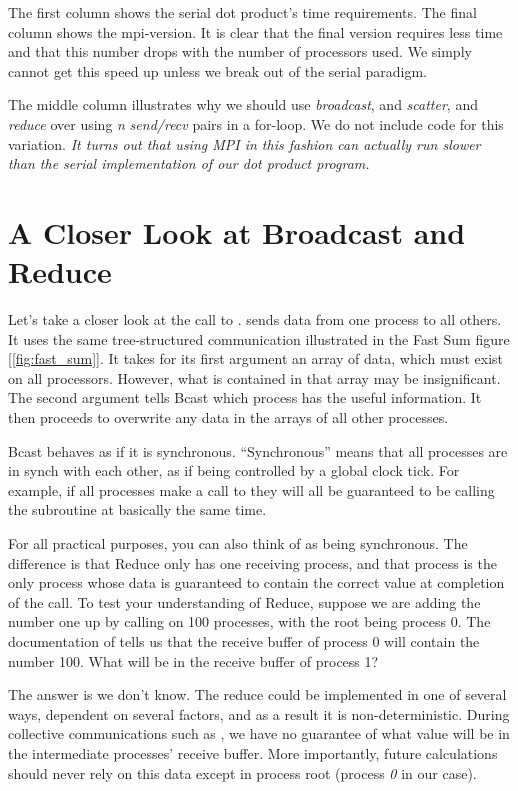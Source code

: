 The first column shows the serial dot product's time requirements. The final column shows the mpi-version. It is clear that the final version requires less time and that this number drops with the number of processors used. We simply cannot get this speed up unless we break out of the serial paradigm.

The middle column illustrates why we should use \emph{broadcast}, and \emph{scatter}, and \emph{reduce} over using \emph{n} \emph{send/recv} pairs in a for-loop. We do not include code for this variation. \emph{It turns out that using MPI in this fashion can actually run slower than the serial implementation of our dot product program.}



\section*{A Closer Look at Broadcast and Reduce}
Let's take a closer look at the call to .  sends data from one process to all others. It uses the same tree-structured communication illustrated in the Fast Sum figure [\ref{fig:fast_sum}]. It takes for its first argument an array of data, which must exist on all processors. However, what is contained in that array may be insignificant. The second argument tells Bcast which process has the useful information. It then proceeds to overwrite any data in the arrays of all other processes.

Bcast behaves as if it is synchronous. ``Synchronous'' means that all processes are in synch with each other, as if being controlled by a global clock tick. For example, if all processes make a call to  they will all be guaranteed to be calling the subroutine at basically the same time.

For all practical purposes, you can also think of  as being synchronous. The difference is that Reduce only has one receiving process, and that process is the only process whose data is guaranteed to contain the correct value at completion of the call. To test your understanding of Reduce, suppose we are adding the number one up by calling  on 100 processes, with the root being process 0. The documentation of  tells us that the receive buffer of process 0 will contain the number 100. What will be in the receive buffer of process 1?

The answer is we don't know. The reduce could be implemented in one of several ways, dependent on several factors, and as a result it is non-deterministic. During collective communications such as , we have no guarantee of what value will be in the intermediate processes' receive buffer. More importantly, future calculations should never rely on this data except in process root (process \emph{0} in our case).


